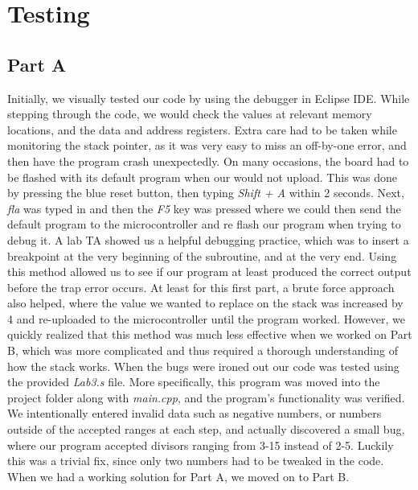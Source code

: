 \documentclass[letterpaper]{article}
\begin{document}
\section{Testing}
  \subsection{Part A}
    Initially, we visually tested our code by using the debugger in Eclipse IDE.
    While stepping through the code, we would check the values at relevant memory
    locations, and the data and address registers. Extra care had to be taken
    while monitoring the stack pointer, as it was very easy to miss an off-by-one
    error, and then have the program crash unexpectedly. On many occasions, the
    board had to be flashed with its default program when our would not
    upload. This was done by pressing the blue reset button, then typing \textit{Shift + A}
    within 2 seconds. Next, \textit{fla} was typed in and then the \textit{F5} key was pressed
    where we could then send the default program to the microcontroller and
    re flash our program when trying to debug it. A lab TA showed us a helpful
    debugging practice, which was to insert a breakpoint at the very beginning
    of the subroutine, and at the very end. Using this method allowed us to see if our
    program at least produced the correct output before the trap error occurs.
    At least for this first part, a brute force approach also helped, where
    the value we wanted to replace on the stack was increased by 4 and re-uploaded to
    the microcontroller until the program worked. However, we quickly realized that
    this method was much less effective when we worked on Part B, which was more complicated
    and thus required a thorough understanding of how the stack works. When the bugs were ironed out
    our code was tested using the provided \textit{Lab3.s} file. More specifically,
    this program was moved into the project folder along with \textit{main.cpp},
    and the program's functionality was verified. We intentionally
    entered invalid data such as negative numbers, or numbers outside of the accepted ranges
    at each step, and actually discovered a small bug, where
    our program accepted divisors ranging from 3-15 instead of 2-5. Luckily this
    was a trivial fix, since only two numbers had to be tweaked in the code.
    When we had a working solution for Part A, we moved on to Part B.
\end{document}
